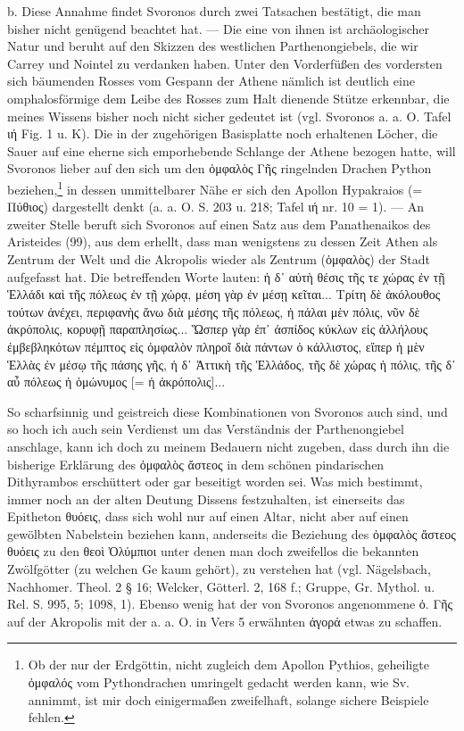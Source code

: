 \documentclass[a4paper, 11pt, oneside]{article}
\begin{document}
b. Diese Annahme findet Svoronos durch zwei Tatsachen bestätigt, die man bisher nicht genügend beachtet hat. --- Die eine von ihnen ist archäologischer Natur und beruht auf den Skizzen des westlichen Parthenongiebels, die wir Carrey und Nointel zu verdanken haben. Unter den Vorderfüßen des vordersten sich bäumenden Rosses vom Gespann der Athene nämlich ist deutlich eine omphalosförmige dem Leibe des Rosses zum Halt dienende Stütze erkennbar, die meines Wissens bisher noch nicht sicher gedeutet ist (vgl. Svoronos a. a. O. Tafel ιή Fig. 1 u. K). Die in der zugehörigen Basisplatte noch erhaltenen Löcher, die Sauer auf eine eherne sich emporhebende Schlange der Athene bezogen hatte, will Svoronos lieber auf den sich um den ὀμφαλὸς Γῆς ringelnden Drachen Python beziehen,\footnote{Ob der nur der Erdgöttin, nicht zugleich dem Apollon Pythios, geheiligte ὀμφαλός vom Pythondrachen umringelt gedacht werden kann, wie Sv. annimmt, ist mir doch einigermaßen zweifelhaft, solange sichere Beispiele fehlen.} in dessen unmittelbarer Nähe er sich den Apollon Hypakraios (= Πύθιος) dargestellt denkt (a. a. O. S. 203 u. 218; Tafel ιή nr. 10 = 1). --- An zweiter Stelle beruft sich Svoronos auf einen Satz aus dem Panathenaikos des Aristeides (99), aus dem erhellt, dass man wenigstens zu dessen Zeit Athen als Zentrum der Welt und die Akropolis wieder als Zentrum (ὀμφαλὸς) der Stadt aufgefasst hat. Die betreffenden Worte lauten: ἡ δ᾽ αὐτὴ θέσις τῆς τε χώρας ἐν τῇ Ἑλλάδι καὶ τῆς πόλεως ἐν τῇ χώρᾳ, μέση γὰρ ἐν μέσῃ κεῖται... Τρίτη δὲ ἀκόλουθος τούτων ἀνέχει, περιφανὴς ἄνω διὰ μέσης τῆς πόλεως, ἡ πάλαι μὲν πόλις, νῦν δὲ ἀκρόπολις, κορυφῇ παραπλησίως... Ὥσπερ γὰρ ἐπ᾽ ἀσπίδος κύκλων εἰς ἀλλήλους ἐμβεβληκότων πέμπτος εἰς ὀμφαλὸν πληροῖ διὰ πάντων ὁ κάλλιστος, εἴπερ ἡ μὲν Ἑλλὰς ἐν μέσῳ τῆς πάσης γῆς, ἡ δ᾽ Ἀττικὴ τῆς Ἑλλάδος, τῆς δὲ χώρας ἡ πόλις, τῆς δ᾽ αὖ πόλεως ἡ ὁμώνυμος [= ἡ ἀκρόπολις]...

So scharfsinnig und geistreich diese Kombinationen von Svoronos auch sind, und so hoch ich auch sein Verdienst um das Verständnis der Parthenongiebel anschlage, kann ich doch zu meinem Bedauern nicht zugeben, dass durch ihn die bisherige Erklärung des ὀμφαλὸς ἄστεος in dem schönen pindarischen Dithyrambos erschüttert oder gar beseitigt worden sei. Was mich bestimmt, immer noch an der alten Deutung Dissens festzuhalten, ist einerseits das Epitheton θυόεις, dass sich wohl nur auf einen Altar, nicht aber auf einen gewölbten Nabelstein beziehen kann, anderseits die Beziehung des ὀμφαλὸς ἄστεος θυόεις zu den θεοὶ Ὀλύμπιοι unter denen man doch zweifellos die bekannten Zwölfgötter (zu welchen Ge kaum gehört), zu verstehen hat (vgl. Nägelsbach, Nachhomer. Theol. 2 § 16; Welcker, Götterl. 2, 168 f.; Gruppe, Gr. Mythol. u. Rel. S. 995, 5; 1098, 1). Ebenso wenig hat der von Svoronos angenommene ὀ. Γῆς auf der Akropolis mit der a. a. O. in Vers 5 erwähnten ἀγορά etwas zu schaffen.
\end{document}
